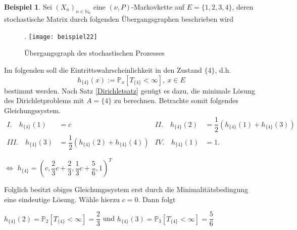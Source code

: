 \documentclass[a4paper,12pt]{scrartcl}
\theoremstyle{definition}
\newtheorem{bsp}{Beispiel}[section]
\begin{document}
\begin{bsp}
Sei $(X_{n})_{n \in \mathbb{N}_{0}}$ eine $(\nu,P)$-Markovkette auf $E = \lbrace 1,2,3,4 \rbrace$, deren stochastische Matrix durch folgenden Übergangsgraphen beschrieben wird
\begin{figure}[H].
\centering
\texttt{[image: beispiel22]}
\caption{Übergangsgraph des stochastischen Prozesses}
\end{figure}
\noindent
Im folgenden soll die Eintrittswahrscheinlichkeit in den Zustand $\lbrace 4 \rbrace$, d.h.
\begin{equation*}
h_{\lbrace    4 \rbrace}(x) := \mathbb{P}_{x}[T_{\lbrace 4 \rbrace} < \infty], \: x \in E
\end{equation*}
bestimmt werden. Nach Satz \ref{Dirichletsatz} genügt es dazu, die minimale Lösung des Dirichletproblems mit $A=\lbrace 4 \rbrace$ zu berechnen. Betrachte somit folgendes Gleichungssystem.
\begin{align*}
     I. \quad h_{\lbrace 4 \rbrace}(1) &= c          & II. \quad h_{\lbrace 4 \rbrace}(2) &= \dfrac{1}{2}(h_{\lbrace 4 \rbrace}(1) + h_{\lbrace 4 \rbrace}(3))  \,  \\ 
  III. \quad h_{\lbrace 4 \rbrace}(3) &= \dfrac{1}{2}(h_{\lbrace 4 \rbrace}(2) + h_{\lbrace 4 \rbrace}(4))   & IV. \quad h_{\lbrace    4 \rbrace}(1) &= 1.
\end{align*}
\begin{center}
$\Leftrightarrow$ $h_{\lbrace 4 \rbrace} = (c, \dfrac{2}{3}c + \dfrac{2}{3}, \dfrac{1}{3}c + \dfrac{5}{6},1)^{T}$
\end{center}
Folglich besitzt obiges Gleichungssystem erst durch die Minimalitätsbedingung eine eindeutige Lösung. Wähle hierzu $c=0$. Dann folgt
\begin{center}
$h_{\lbrace 4 \rbrace}(2) = \mathbb{P}_{2}[T_{\lbrace 4 \rbrace} < \infty] = \dfrac{2}{3}$ und $h_{\lbrace 4 \rbrace}(3) = \mathbb{P}_{3}[T_{\lbrace 4 \rbrace} < \infty] = \dfrac{5}{6}$
\end{center}
\end{bsp}
\end{document}
